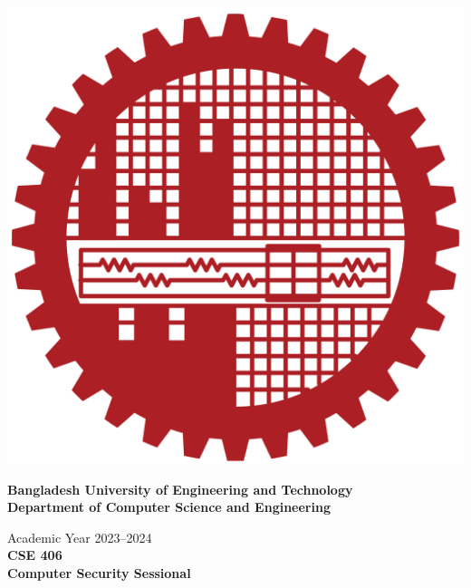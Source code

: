 \begin{titlepage}
    \begin{centering}
        \vspace*{0.1cm}
        
          
        \includegraphics[scale=.09]{images/buet_logo.png}
        
         \Large
         \textbf{Bangladesh University of Engineering and Technology}\\[.3cm]
         
        \large
         \textbf{Department of Computer Science and Engineering}
         \vspace{.3cm}
         
        Academic Year 2023--2024\\[0.5cm]
        \Large
        \textbf{CSE 406\\
        Computer Security Sessional\\}
        \vspace{0.5cm}
        

\end{centering}
\end{titlepage}
